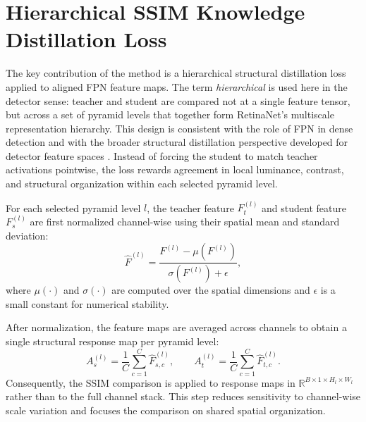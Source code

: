 \section{Hierarchical SSIM Knowledge Distillation Loss}

The key contribution of the method is a hierarchical structural distillation loss applied to aligned FPN feature maps. The term \emph{hierarchical} is used here in the detector sense: teacher and student are compared not at a single feature tensor, but across a set of pyramid levels that together form RetinaNet's multiscale representation hierarchy. This design is consistent with the role of FPN in dense detection and with the broader structural distillation perspective developed for detector feature spaces \cite{lin2017fpn,wang2004ssim,wang2003msssim,derijk2022structural}. Instead of forcing the student to match teacher activations pointwise, the loss rewards agreement in local luminance, contrast, and structural organization within each selected pyramid level.

\FPNSSIMMethodFigure

For each selected pyramid level $l$, the teacher feature $F_t^{(l)}$ and student feature $F_s^{(l)}$ are first normalized channel-wise using their spatial mean and standard deviation:
\begin{equation}
\hat{F}^{(l)} = \frac{F^{(l)} - \mu(F^{(l)})}{\sigma(F^{(l)}) + \epsilon},
\end{equation}
where $\mu(\cdot)$ and $\sigma(\cdot)$ are computed over the spatial dimensions and $\epsilon$ is a small constant for numerical stability.

After normalization, the feature maps are averaged across channels to obtain a single structural response map per pyramid level:
\begin{equation}
A_s^{(l)} = \frac{1}{C}\sum_{c=1}^{C}\hat{F}_{s,c}^{(l)}, \qquad
A_t^{(l)} = \frac{1}{C}\sum_{c=1}^{C}\hat{F}_{t,c}^{(l)}.
\end{equation}
Consequently, the SSIM comparison is applied to response maps in $\mathbb{R}^{B \times 1 \times H_l \times W_l}$ rather than to the full channel stack. This step reduces sensitivity to channel-wise scale variation and focuses the comparison on shared spatial organization.


